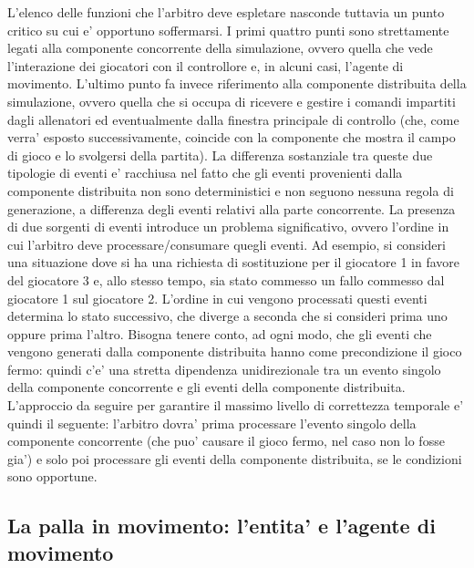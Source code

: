 L'elenco delle funzioni che l'arbitro deve espletare nasconde tuttavia un punto critico su cui e' opportuno soffermarsi. I primi quattro punti sono strettamente legati alla componente concorrente della simulazione, ovvero quella che vede l'interazione dei giocatori con il controllore e, in alcuni casi, l'agente di movimento. L'ultimo punto fa invece riferimento alla componente distribuita della simulazione, ovvero quella che si occupa di ricevere e gestire i comandi impartiti dagli allenatori ed eventualmente dalla finestra principale di controllo (che, come verra' esposto successivamente, coincide con la componente che mostra il campo di gioco e lo svolgersi della partita). La differenza sostanziale tra queste due tipologie di eventi e' racchiusa nel fatto che gli eventi provenienti dalla componente distribuita non sono deterministici e non seguono nessuna regola di generazione, a differenza degli eventi relativi alla parte concorrente.
La presenza di due sorgenti di eventi introduce un problema significativo, ovvero l'ordine in cui l'arbitro deve processare/consumare quegli eventi. Ad esempio, si consideri una situazione dove si ha una richiesta di sostituzione per il giocatore 1 in favore del giocatore 3 e, allo stesso tempo, sia stato commesso un fallo commesso dal giocatore 1 sul giocatore 2. L'ordine in cui vengono processati questi eventi determina lo stato successivo, che diverge a seconda che si consideri prima uno oppure prima l'altro. Bisogna tenere conto, ad ogni modo, che gli eventi che vengono generati dalla componente distribuita hanno come precondizione il gioco fermo: quindi c'e' una stretta dipendenza unidirezionale tra un evento singolo della componente concorrente e gli eventi della componente distribuita. L'approccio da seguire per garantire il massimo livello di correttezza temporale e' quindi il seguente: l'arbitro dovra' prima processare l'evento singolo della componente concorrente (che puo' causare il gioco fermo, nel caso non lo fosse gia') e solo poi processare gli eventi della componente distribuita, se le condizioni sono opportune.

\subsection*{La palla in movimento: l'entita' e l'agente di movimento}
%
\label{sec:modello_palla_agente_movimento}


